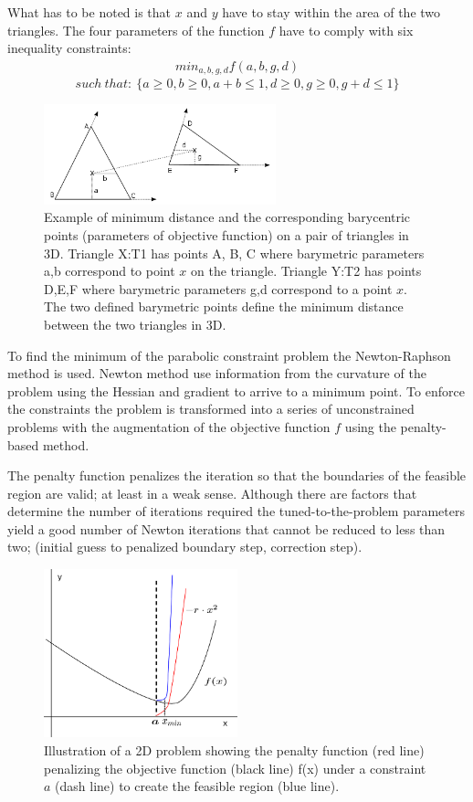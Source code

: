\documentclass[times,12pt]{article}
\begin{document}
What has to be noted is that $x$ and $y$ have to stay within the area of the two triangles. The four parameters of the function $f$ have to comply with six inequality constraints:
\begin{align*}
min_{a,b,g,d} f(a,b,g,d)
\end{align*}  
$$such \:that: \: \{a\geq0,b\geq0, a+b\leq1, d\geq0, g\geq0, g+d\leq1 \}$$ 

\begin{figure}[!h]
\centering
\includegraphics[width=0.6\textwidth]{c} \protect\caption{\label{fig1}Example of minimum distance and the corresponding barycentric points (parameters of objective function) on a pair of triangles in 3D. Triangle X:T1 has points A, B, C where barymetric parameters a,b correspond to point $x$ on the triangle. Triangle Y:T2 has points D,E,F where barymetric parameters g,d correspond to a point $x$. The two defined barymetric points define the minimum distance between the two triangles in 3D.}
\end{figure} 

To find the minimum of the parabolic constraint problem the Newton-Raphson method is used. Newton method use information from the curvature of the problem using the Hessian and gradient to arrive to a minimum point. To enforce the constraints the problem is transformed into a series of unconstrained problems with the augmentation of the objective function $f$ using the penalty-based method.

The penalty function penalizes the iteration so that the boundaries of the feasible region are valid; at least in a weak sense. Although there are factors that determine the number of iterations required the tuned-to-the-problem parameters yield a good number of Newton iterations that cannot be reduced to less than two; (initial guess to penalized boundary step, correction step).

\begin{figure}[!h]
\centering
\includegraphics[width=0.5\textwidth]{penalty} \protect\caption{\label{fig2}Illustration of a 2D problem showing the penalty function (red line) penalizing the objective function (black line) f(x) under a constraint $a$ (dash line) to create the feasible region (blue line).}
\end{figure} 
\end{document}

